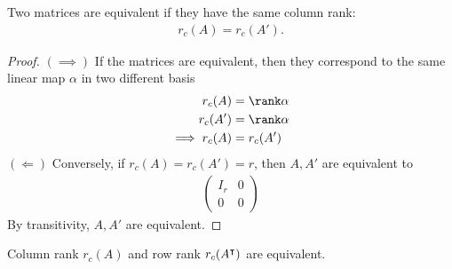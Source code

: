 \begin{proposition}
    Two matrices are equivalent if they have the same column rank:
    \begin{align*}
        r_c(A) = r_c(A').
    \end{align*}
\end{proposition}
\begin{proof}
    $(\implies)$ If the matrices are equivalent, then they correspond to the same linear map $\alpha$ in two different basis
    \begin{align*}
        r_c(A) &= \rank \alpha \\
        r_c(A') &= \rank \alpha \\
        \implies r_c(A) &= r_c(A')
    \end{align*} 
    $(\Longleftarrow)$ Conversely, if $r_c(A) = r_c(A') = r$, then $A, A'$ are equivalent to
    \begin{align*}
        \begin{pmatrix}
            I_r & 0 \\
            0   & 0
        \end{pmatrix}
    \end{align*}
    By transitivity, $A, A'$ are equivalent.
\end{proof}
\begin{theorem}
    Column rank $r_c(A)$ and row rank $r_c(A^\intercal)$ are equivalent.
\end{theorem}
